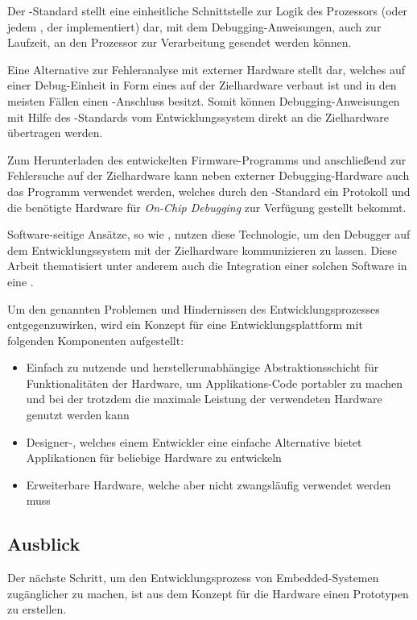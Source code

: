     Der -Standard stellt eine einheitliche Schnittstelle zur Logik des Prozessors (oder jedem
    , der  implementiert) dar, mit dem Debugging-Anweisungen, auch zur Laufzeit, an den
    Prozessor zur Verarbeitung gesendet werden können.

    Eine Alternative zur Fehleranalyse mit externer Hardware stellt  dar, welches auf einer Debug-Einheit in Form
    eines  auf der Zielhardware verbaut ist und in den meisten Fällen einen -Anschluss besitzt. Somit können
    Debugging-Anweisungen mit Hilfe des -Standards vom Entwicklungssystem direkt an die Zielhardware übertragen
    werden.

    Zum Herunterladen des entwickelten Firmware-Programms und anschließend zur Fehlersuche auf der Zielhardware kann
    neben externer Debugging-Hardware auch das Programm  verwendet werden, welches durch den -Standard ein
    Protokoll und die benötigte Hardware für \textit{On-Chip Debugging} zur Verfügung gestellt bekommt.

    Software-seitige Ansätze, so wie , nutzen diese Technologie, um den Debugger auf dem Entwicklungssystem mit
    der Zielhardware kommunizieren zu lassen. Diese Arbeit thematisiert unter anderem auch die Integration einer
    solchen Software in eine .

    Um den genannten Problemen und Hindernissen des Entwicklungsprozesses entgegenzuwirken, wird ein Konzept für eine
    Entwicklungsplattform mit folgenden Komponenten aufgestellt:
    \begin{itemize}
        \item Einfach zu nutzende und herstellerunabhängige Abstraktionsschicht für Funktionalitäten der Hardware, um
        Applikations-Code portabler zu machen und bei der trotzdem die maximale Leistung der verwendeten Hardware
        genutzt werden kann
        \item Designer-, welches einem Entwickler eine einfache Alternative bietet Applikationen für
         beliebige Hardware zu entwickeln
        \item Erweiterbare Hardware, welche aber nicht zwangsläufig verwendet werden muss
    \end{itemize}

    \subsection{Ausblick}
    \label{sec:prospect}
    Der nächste Schritt, um den Entwicklungsprozess von Embedded-Systemen zugänglicher zu machen, ist aus dem Konzept
    für die Hardware einen Prototypen zu erstellen.

